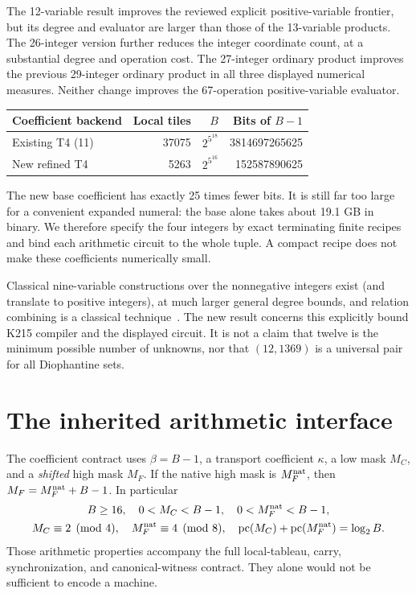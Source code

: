 \documentclass[11pt]{article}
\newcommand{\pc}{\operatorname{pc}}
\theoremstyle{remark}\newtheorem{remark}[theorem]{Remark}
\begin{document}
The 12-variable result improves the reviewed explicit positive-variable
frontier, but its degree and evaluator are larger than those of the
13-variable products. The 26-integer version further reduces the integer
coordinate count, at a substantial degree and operation cost.
The 27-integer ordinary product improves the previous
29-integer ordinary product in all three displayed numerical measures.
Neither change improves the 67-operation positive-variable evaluator.

\begin{center}\small
\begin{tabular}{lrrr}
\toprule
Coefficient backend & Local tiles & $B$ & Bits of $B-1$\\
\midrule
Existing T4 (11)&37075&$2^{5^{18}}$&3814697265625\\
New refined T4&5263&$2^{5^{16}}$&152587890625\\
\bottomrule
\end{tabular}
\end{center}

The new base coefficient has exactly 25 times fewer bits. It is still far too
large for a convenient expanded numeral: the base alone takes about 19.1 GB
in binary. We therefore specify the four integers by exact terminating finite
recipes and bind each arithmetic circuit to the whole tuple. A compact recipe
does not make these coefficients numerically small.

Classical nine-variable constructions over the nonnegative integers exist
(and translate to positive integers), at much larger general degree
bounds, and relation combining is a classical technique~\cite{mr75,jones82,bayer}.
The new result concerns this explicitly bound K215 compiler and the displayed
circuit. It is not a claim that twelve is the minimum possible number of
unknowns, nor that $(12,1369)$ is a universal pair for all Diophantine sets.

\section{The inherited arithmetic interface}\label{sec:interface}

The coefficient contract uses $\beta=B-1$, a transport coefficient $\kappa$,
a low mask $M_C$, and a \emph{shifted} high mask $M_F$. If the native high mask
is $M_F^{\rm nat}$, then $M_F=M_F^{\rm nat}+B-1$. In particular
\begin{gather}
 B\ge16,\quad 0<M_C<B-1,\quad0<M_F^{\rm nat}<B-1,\notag\\
 M_C\equiv2\pmod4,\quad M_F^{\rm nat}\equiv4\pmod8,\quad
 \pc(M_C)+\pc(M_F^{\rm nat})=\log_2B.\label{eq:maskcontract}
\end{gather}
Those arithmetic properties accompany the full local-tableau, carry,
synchronization, and canonical-witness contract. They alone would not be
sufficient to encode a machine.
\end{document}
